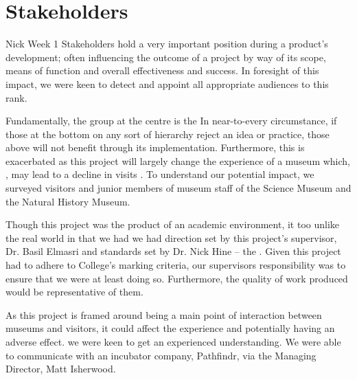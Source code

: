 \section{Stakeholders}
Nick Week 1
Stakeholders hold a very important position during a product's development; often influencing the outcome of a project by way of its scope, means of function and overall effectiveness and success. In foresight of this impact, we were keen to detect and appoint all appropriate audiences to this rank.

Fundamentally, the group at the centre is the  In near-to-every circumstance,  if those at the bottom on any sort of hierarchy reject an idea or practice, those above will not benefit through its implementation. Furthermore, this is exacerbated as this project will largely change the  experience of a museum which, , may lead to a decline in visits . To understand our potential impact, we surveyed visitors and junior members of museum staff of the Science Museum and the Natural History Museum. 

Though this project was the product of an academic environment, it  too unlike the real world in that we had we had direction set by this project’s supervisor, Dr. Basil Elmasri  and standards set by Dr. Nick Hine – the . Given this project had to adhere to College's marking criteria, our supervisors responsibility was to ensure that we were at least doing so. Furthermore, the quality of work  produced would  be representative of them. 

As this project is framed around being a main point of interaction between museums and visitors, it could affect the experience and potentially having an adverse effect.   we were keen to get an experienced understanding. We were able to communicate with an incubator company, Pathfindr, via the Managing Director, Matt Isherwood.  

